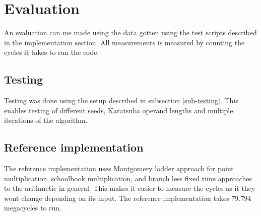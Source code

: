 \section{Evaluation}



An evaluation can me made using the data gotten using the test scripts described in the implementation section. All measurements is measured by counting the cycles it takes to run the code.

\subsection{Testing}
Testing was done using the setup described in subsection \ref{sub-testing}. This enables testing of different seeds, Karatsuba operand lengths and multiple iterations of the algorithm.


\subsection{Reference implementation}
The reference implementation uses Montgomery ladder approach for point multiplication, schoolbook multiplication, and branch less fixed time approaches to the arithmetic in general. This makes it easier to measure the cycles as it they wont change depending on its input. The reference implementation takes $79.794$ megacycles to run.

